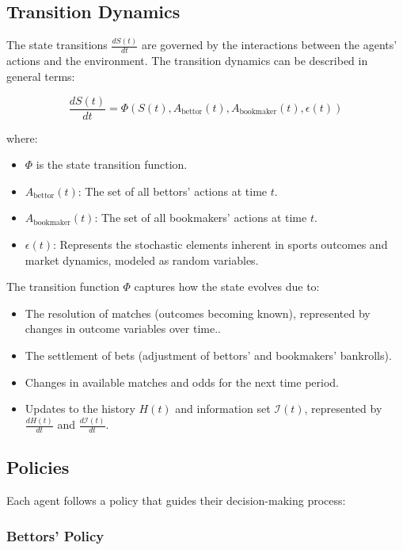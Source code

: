 \subsection{Transition Dynamics}

The state transitions \( \frac{dS(t)}{dt} \) are governed by the interactions between the agents' actions and the environment. The transition dynamics can be described in general terms:

\[
\frac{dS(t)}{dt} = \Phi\left( S(t), A_{\text{bettor}}(t), A_{\text{bookmaker}}(t), \epsilon(t) \right)
\]

where:

\begin{itemize}
    \item \( \Phi \) is the state transition function.
    \item \( A_{\text{bettor}}(t) \): The set of all bettors' actions at time \( t \).
    \item \( A_{\text{bookmaker}}(t) \): The set of all bookmakers' actions at time \( t \).
    \item \( \epsilon(t) \): Represents the stochastic elements inherent in sports outcomes and market dynamics, modeled as random variables.
\end{itemize}

The transition function \( \Phi \) captures how the state evolves due to:

\begin{itemize}
    \item The resolution of matches (outcomes becoming known), represented by changes in outcome variables over time..
    \item The settlement of bets (adjustment of bettors' and bookmakers' bankrolls).
    \item Changes in available matches and odds for the next time period.
    \item Updates to the history \( H(t) \) and information set \( \mathcal{I}(t) \), represented by \(\frac{dH(t)}{dt}\) and \(\frac{d\mathcal{I}(t)}{dt}\).
\end{itemize}


\subsection{Policies}

Each agent follows a policy that guides their decision-making process:

\subsubsection{Bettors' Policy}

